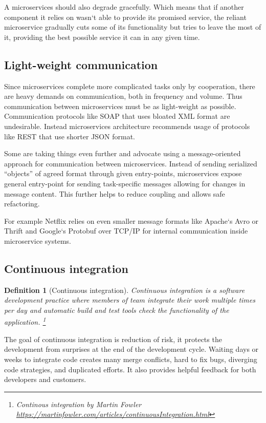 \documentclass[12pt,oneside]{fithesis2}
\newtheorem{definition}{Definition}
\begin{document}
A microservices should also degrade gracefully. Which means that if another component it relies on wasn`t able to provide its promised service, the reliant microservice gradually cuts some of its functionality but tries to leave the most of it, providing the best possible service it can in any given time.

\subsection{Light-weight communication}

Since microservices complete more complicated tasks only by cooperation, there are heavy demands on communication, both in frequency and volume. Thus communication between microservices must be as light-weight as possible. Communication protocols like SOAP that uses bloated XML format are undesirable. Instead microservices architecture recommends usage of protocols like REST that use shorter JSON format.

Some are taking things even further and advocate using a message-oriented approach for communication between microservices. Instead of sending serialized “objects” of agreed format through given entry-points, microservices expose general entry-point for sending task-specific messages allowing for changes in message content. This further helps to reduce coupling and allows safe refactoring.

For example Netflix relies on even smaller message formats like Apache`s Avro or Thrift and Google`s Protobuf over TCP/IP for internal communication inside microservice systems. \cite{ma}

\subsection{Continuous integration}

\begin{definition}[Continuous integration]
Continuous integration is a software development practice where members of team integrate their work multiple times per day and automatic build and test tools check the functionality of the application. \footnote{Continous integration by Martin Fowler \url{https://martinfowler.com/articles/continuousIntegration.html}}
\end{definition}

The goal of continuous integration is reduction of risk, it protects the development from surprises at the end of the development cycle. Waiting days or weeks to integrate code creates many merge conflicts, hard to fix bugs, diverging code strategies, and duplicated efforts. It also provides helpful feedback for both developers and customers.
\end{document}
